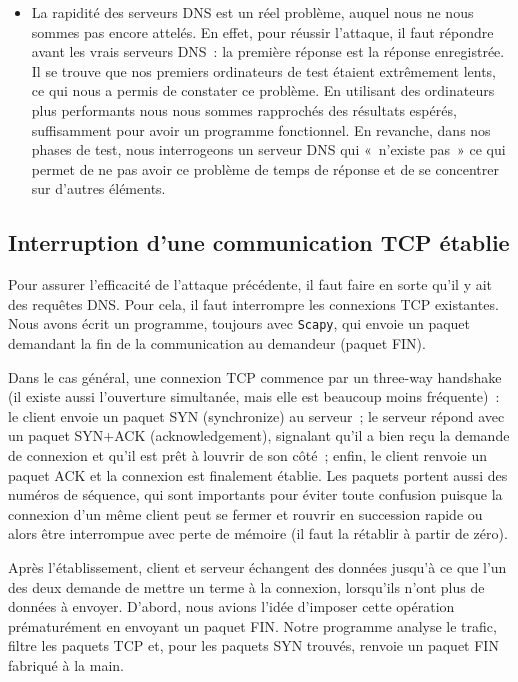 \documentclass[a4paper, 12pt,twoside]{article}
\begin{document}
\begin{itemize}[label=\color{bleu303}\textbullet{}]
        \item La rapidité des serveurs DNS est un réel problème, auquel nous ne nous sommes pas encore attelés. En effet, pour réussir l'attaque, il faut répondre avant les vrais serveurs DNS~: la première réponse est la réponse enregistrée. Il se trouve que nos premiers ordinateurs de test étaient extrêmement lents, ce qui nous a permis de constater ce problème. En utilisant des ordinateurs plus performants nous nous sommes rapprochés des résultats espérés, suffisamment pour avoir un programme fonctionnel. En revanche, dans nos phases de test, nous interrogeons un serveur DNS qui «~n'existe pas~» ce qui permet de ne pas avoir ce problème de temps de réponse et de se concentrer sur d'autres éléments.
    \end{itemize}

    \subsection{Interruption d'une communication TCP établie}


  Pour assurer l'efficacité de l'attaque précédente, il faut faire en sorte qu'il y ait des requêtes DNS. Pour cela, il faut interrompre les connexions TCP existantes. Nous avons écrit un programme, toujours avec \verb!Scapy!, qui envoie un paquet demandant la fin de la communication au demandeur (paquet FIN).


       Dans le cas général, une connexion TCP commence par un three-way handshake (il existe aussi l’ouverture simultanée, mais elle est beaucoup moins fréquente)~: le client envoie un paquet SYN (synchronize) au serveur~; le serveur répond avec un paquet SYN+ACK (acknowledgement), signalant qu'il a bien reçu la demande de connexion et qu'il est prêt à louvrir de son côté~; enfin, le client renvoie un paquet ACK et la connexion est finalement établie. Les paquets portent aussi des numéros de séquence, qui sont importants pour éviter toute confusion puisque la connexion d'un même client peut se fermer et rouvrir en succession rapide ou alors être interrompue avec perte de mémoire (il faut la rétablir à partir de zéro).
    
      Après l'établissement, client et serveur échangent des données jusqu'à ce que l'un des deux demande de mettre un terme à la connexion, lorsqu'ils n'ont plus de données à envoyer. D'abord, nous avions l'idée d'imposer cette opération prématurément en envoyant un paquet FIN. Notre programme analyse le trafic, filtre les paquets TCP et, pour les paquets SYN trouvés, renvoie un paquet FIN fabriqué à la main.
    
\end{document}
